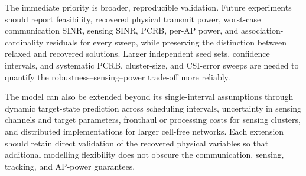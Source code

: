 The immediate priority is broader, reproducible validation. Future experiments
should report feasibility, recovered physical transmit power, worst-case
communication SINR, sensing SINR, PCRB, per-AP power, and
association-cardinality residuals for every sweep, while preserving the
distinction between relaxed and recovered solutions. Larger independent seed
sets, confidence intervals, and systematic PCRB, cluster-size, and CSI-error
sweeps are needed to quantify the robustness--sensing--power trade-off more
reliably.

The model can also be extended beyond its single-interval assumptions through
dynamic target-state prediction across scheduling intervals, uncertainty in
sensing channels and target parameters, fronthaul or processing costs for
sensing clusters, and distributed implementations for larger cell-free
networks. Each extension should retain direct validation of the recovered
physical variables so that additional modelling flexibility does not obscure
the communication, sensing, tracking, and AP-power guarantees.
